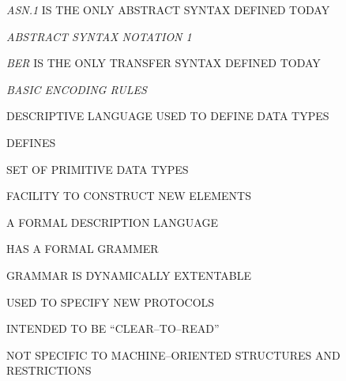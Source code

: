 \begin{bwslide}

\begin{nrtc}
\item	{\em ASN.1} IS THE ONLY ABSTRACT SYNTAX DEFINED TODAY
	\begin{nrtc}
	\item	{\em ABSTRACT SYNTAX NOTATION 1}
	\end{nrtc}
\item	{\em BER} IS THE ONLY TRANSFER SYNTAX DEFINED TODAY
	\begin{nrtc}
	\item	{\em BASIC ENCODING RULES}
	\end{nrtc}
\end{nrtc}
\end{bwslide}


\begin{bwslide}

\begin{nrtc}
\item	DESCRIPTIVE LANGUAGE USED TO DEFINE DATA TYPES
\item	DEFINES
	\begin{nrtc}
	\item	SET OF PRIMITIVE DATA TYPES
	\item	FACILITY TO CONSTRUCT NEW ELEMENTS
	\end{nrtc}
\item	A FORMAL DESCRIPTION LANGUAGE
	\begin{nrtc}
	\item	HAS A FORMAL GRAMMER
	\end{nrtc}
\item	GRAMMAR IS DYNAMICALLY EXTENTABLE
\item	USED TO SPECIFY NEW PROTOCOLS
	\begin{nrtc}
	\item	INTENDED TO BE ``CLEAR--TO--READ''
	\item	NOT SPECIFIC TO MACHINE--ORIENTED STRUCTURES AND RESTRICTIONS
	\end{nrtc}
\end{nrtc}
\end{bwslide}


%


